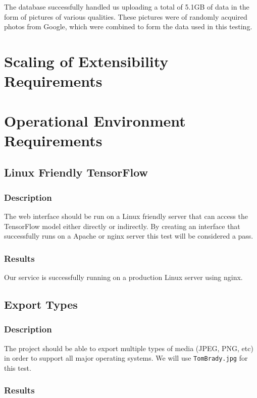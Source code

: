 \documentclass{scrreprt}
\begin{document}
The database successfully handled us uploading a total of 5.1GB of data in the
form of pictures of various qualities. These pictures were of randomly acquired
photos from Google, which were combined to form the data used in this testing.

\section{Scaling of Extensibility Requirements}

\section{Operational Environment Requirements}

\subsection{Linux Friendly TensorFlow}
\subsubsection{Description}

The web interface should be run on a Linux friendly server that can access the
TensorFlow model either directly or indirectly. By creating an interface that
successfully runs on a Apache or nginx server this test will be considered a
pass.

\subsubsection{Results}

Our service is successfully running on a production Linux server using nginx.

\subsection{Export Types}
\subsubsection{Description}

The project should be able to export multiple types of media (JPEG, PNG, etc)
in order to support all major operating systems. We will use \verb|TomBrady.jpg| for
this test.

\subsubsection{Results}
\end{document}
